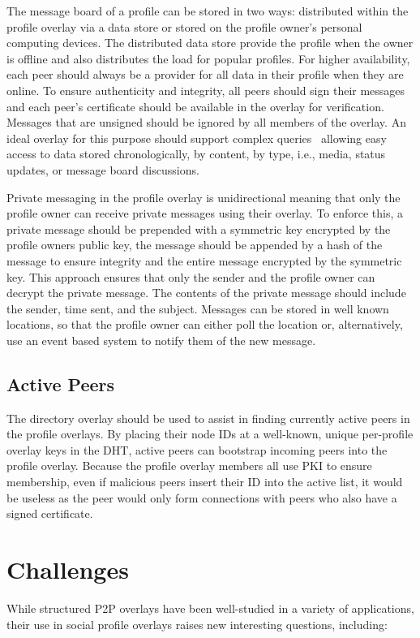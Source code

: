 The message board of a profile can be stored in two ways: distributed within the
profile overlay via a data store or stored on the profile owner's personal
computing devices.  The distributed data store provide the profile when the
owner is offline and also distributes the load for popular profiles.  For
higher availability, each peer should always be a provider for all data in their
profile when they are online.  To ensure authenticity and integrity, all peers
should sign their messages and each peer's certificate should be available in
the overlay for verification.  Messages that are unsigned should be ignored
by all members of the overlay.  An ideal overlay for this purpose should
support complex queries~\cite{complex_queries} allowing easy access to data
stored chronologically, by content, by type, i.e., media, status updates,
or message board discussions.

Private messaging in the profile overlay is unidirectional meaning that only
the profile owner can receive private messages using their overlay.  To
enforce this, a private message should be prepended with a symmetric key
encrypted by the profile owners public key, the message should be appended
by a hash of the message to ensure integrity and the entire message encrypted
by the symmetric key.  This approach ensures that only the sender and the
profile owner can decrypt the private message.  The contents of the private
message should include the sender, time sent, and the subject.  Messages can
be stored in well known locations, so that the profile owner can either poll
the location or, alternatively, use an event based system to notify them of
the new message.

\subsection{Active Peers}
The directory overlay should be used to assist in finding currently active peers
in the profile overlays.  By placing their node IDs at a well-known, unique
per-profile overlay keys in the DHT, active peers can bootstrap incoming peers
into the profile overlay.  Because the profile overlay members all use PKI to
ensure membership, even if malicious peers insert their ID into the active
list, it would be useless as the peer would only form connections with peers
who also have a signed certificate.

\section{Challenges}
\label{outstanding}
While structured P2P overlays have been well-studied in a variety of applications,
their use in social profile overlays raises new interesting questions, including:

